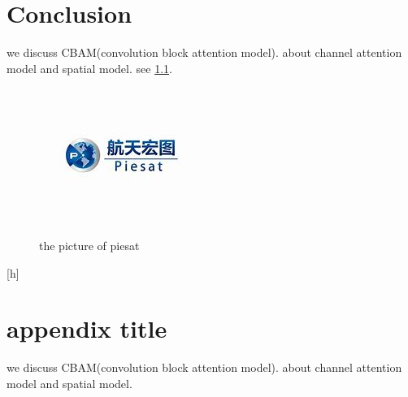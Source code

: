 \documentclass[12pt]{report}
\begin{document}
\chapter{Conclusion}
we discuss CBAM(convolution block attention model). about 
channel attention model and spatial model. see \ref{fig:1}.
\begin{figure}[h]
    \centering
    \includegraphics{piesat.jpg}
    \caption{the picture of piesat}
    \label{fig:1}
\end{figure}[h]

\appendix
\chapter{appendix title}
we discuss CBAM(convolution block attention model). about 
channel attention model and spatial model.
\end{document}
